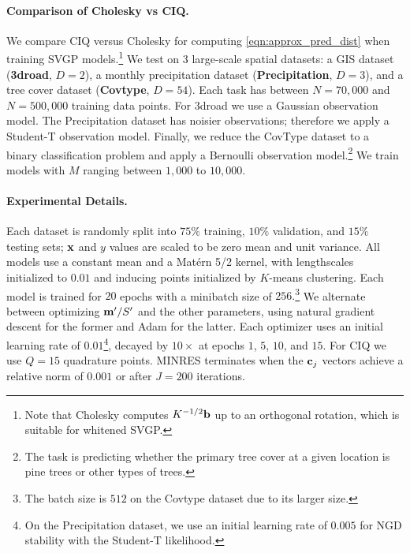 \paragraph{Comparison of Cholesky vs CIQ.}
We compare CIQ versus Cholesky for computing \cref{eqn:approx_pred_dist} when training SVGP models.\footnote{
  Note that Cholesky computes $K^{-1/2} \mathbf{b}$ up to an orthogonal rotation, which is suitable for whitened SVGP.
}
We test on 3 large-scale spatial datasets: a GIS dataset ({\bf 3droad}, $D=2$), a monthly precipitation dataset ({\bf Precipitation}, $D=3$), and a tree cover dataset ({\bf Covtype}, $D=54$).
Each task has between $N=70,\!000$ and $N=500,\!000$ training data points.
For 3droad we use a Gaussian observation model.
The Precipitation dataset has noisier observations; therefore we apply a Student-T observation model.
Finally, we reduce the CovType dataset to a binary classification problem and apply a Bernoulli observation model.\footnote{
  The task is predicting whether the primary tree cover at a given location is pine trees or other types of trees.
}
We train models with $M$ ranging between $1,\!000$ to $10,\!000$.

\paragraph{Experimental Details.}
Each dataset is randomly split into $75\%$ training, $10\%$ validation, and $15\%$ testing sets; $\mathbf{x}$ and $y$ values are scaled to be zero mean and unit variance.
All models use a constant mean and a Mat\'ern 5/2 kernel, with lengthscales initialized to $0.01$ and inducing points initialized by $K$-means clustering.
Each model is trained for $20$ epochs with a minibatch size of $256.$\footnote{
  The batch size is $512$ on the Covtype dataset due to its larger size.
}
We alternate between optimizing $\mathbf{m}'/S'$ and the other parameters, using natural gradient descent for the former and Adam \cite{kingma2014adam} for the latter.
Each optimizer uses an initial learning rate of $0.01$\footnote{
  On the Precipitation dataset, we use an initial learning rate of $0.005$ for  NGD stability with the Student-T likelihood.
}, decayed by $10\times$ at epochs $1$, $5$, $10$, and $15$.
For CIQ we use $Q = 15$ quadrature points.
MINRES terminates when the $\mathbf{c}_j$ vectors achieve a relative norm of $0.001$ or after $J=200$ iterations.


